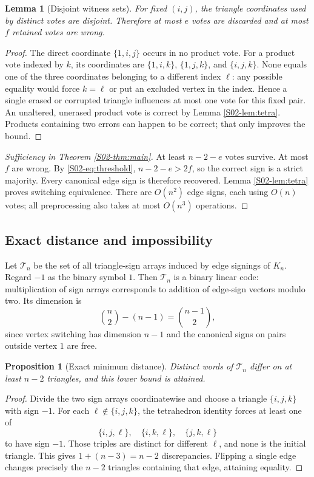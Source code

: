 \documentclass[11pt,a4paper]{article}
\newtheorem{lemma}[theorem]{Lemma}
\newtheorem{proposition}[theorem]{Proposition}
\theoremstyle{definition}\newtheorem{definition}[theorem]{Definition}
\theoremstyle{remark}\newtheorem{remark}[theorem]{Remark}
\numberwithin{equation}{section}
\begin{document}
\begin{lemma}[Disjoint witness sets]\label{S02-lem:disjoint}
For fixed $(i,j)$, the triangle coordinates used by distinct votes are disjoint. Therefore at most $e$ votes are discarded and at most $f$ retained votes are wrong.
\end{lemma}
\begin{proof}
The direct coordinate $\{1,i,j\}$ occurs in no product vote. For a product vote indexed by $k$, its coordinates are $\{1,i,k\}$, $\{1,j,k\}$, and $\{i,j,k\}$. None equals one of the three coordinates belonging to a different index $\ell$: any possible equality would force $k=\ell$ or put an excluded vertex in the index. Hence a single erased or corrupted triangle influences at most one vote for this fixed pair. An unaltered, unerased product vote is correct by Lemma \ref{S02-lem:tetra}. Products containing two errors can happen to be correct; that only improves the bound.
\end{proof}

\begin{proof}[Sufficiency in Theorem \ref{S02-thm:main}]
At least $n-2-e$ votes survive. At most $f$ are wrong. By \eqref{S02-eq:threshold}, $n-2-e>2f$, so the correct sign is a strict majority. Every canonical edge sign is therefore recovered. Lemma \ref{S02-lem:tetra} proves switching equivalence. There are $O(n^2)$ edge signs, each using $O(n)$ votes; all preprocessing also takes at most $O(n^3)$ operations.
\end{proof}

\subsection{Exact distance and impossibility}\label{S02-sec-4}
Let $\mathcal T_n$ be the set of all triangle-sign arrays induced by edge signings of $K_n$. Regard $-1$ as the binary symbol $1$. Then $\mathcal T_n$ is a binary linear code: multiplication of sign arrays corresponds to addition of edge-sign vectors modulo two. Its dimension is
\[
 \binom n2-(n-1)=\binom{n-1}{2},
\]
since vertex switching has dimension $n-1$ and the canonical signs on pairs outside vertex $1$ are free.

\begin{proposition}[Exact minimum distance]\label{S02-prop:distance}
Distinct words of $\mathcal T_n$ differ on at least $n-2$ triangles, and this lower bound is attained.
\end{proposition}
\begin{proof}
Divide the two sign arrays coordinatewise and choose a triangle $\{i,j,k\}$ with sign $-1$. For each $\ell\notin\{i,j,k\}$, the tetrahedron identity forces at least one of
\[
 \{i,j,\ell\},\quad\{i,k,\ell\},\quad\{j,k,\ell\}
\]
to have sign $-1$. Those triples are distinct for different $\ell$, and none is the initial triangle. This gives $1+(n-3)=n-2$ discrepancies. Flipping a single edge changes precisely the $n-2$ triangles containing that edge, attaining equality.
\end{proof}
\end{document}
